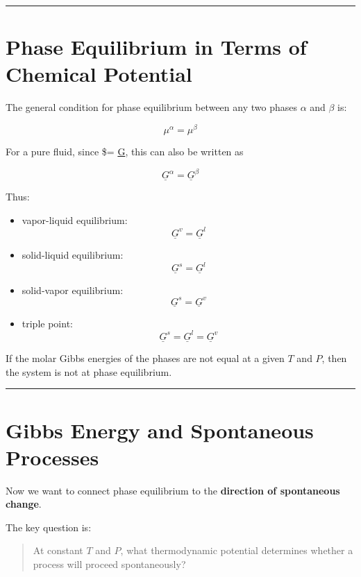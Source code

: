\documentclass[
  letterpaper,
  DIV=11,
  numbers=noendperiod]{scrartcl}
\begin{document}
\begin{center}\rule{0.5\linewidth}{0.5pt}\end{center}

\section{Phase Equilibrium in Terms of Chemical
Potential}\label{phase-equilibrium-in-terms-of-chemical-potential}

The general condition for phase equilibrium between any two phases
\(\alpha\) and \(\beta\) is:

\[
\mu^\alpha = \mu^\beta
\]

For a pure fluid, since \$\mu = \underline{G}, this can also be written
as

\[
\underline{G}^\alpha = \underline{G}^\beta
\]

Thus:

\begin{itemize}
\item
  vapor-liquid equilibrium: \[
  \underline{G}^v = \underline{G}^l
  \]
\item
  solid-liquid equilibrium: \[
  \underline{G}^s = \underline{G}^l
  \]
\item
  solid-vapor equilibrium: \[
  \underline{G}^s = \underline{G}^v
  \]
\item
  triple point: \[
  \underline{G}^s = \underline{G}^l = \underline{G}^v
  \]
\end{itemize}

If the molar Gibbs energies of the phases are not equal at a given \(T\)
and \(P\), then the system is not at phase equilibrium.

\begin{center}\rule{0.5\linewidth}{0.5pt}\end{center}

\section{Gibbs Energy and Spontaneous
Processes}\label{gibbs-energy-and-spontaneous-processes}

Now we want to connect phase equilibrium to the \textbf{direction of
spontaneous change}.

The key question is:

\begin{quote}
At constant \(T\) and \(P\), what thermodynamic potential determines
whether a process will proceed spontaneously?
\end{quote}
\end{document}
